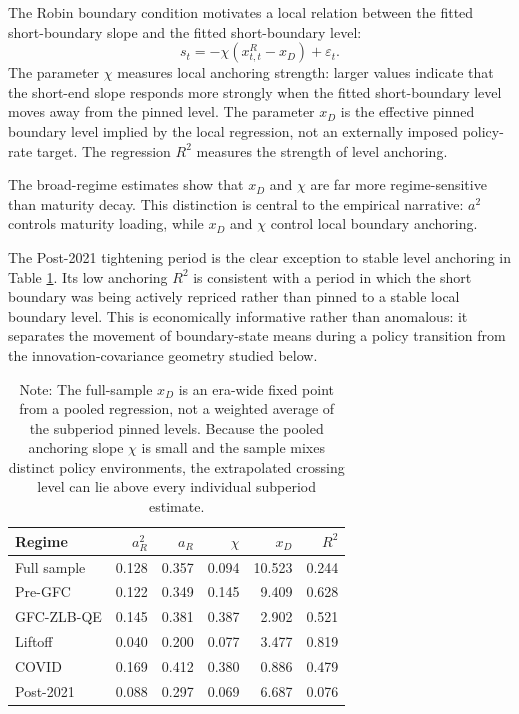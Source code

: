 \documentclass[11pt]{article}
\begin{document}
The Robin boundary condition motivates a local relation between the fitted short-boundary slope and the fitted short-boundary level:
\begin{equation}
 s_t=-\chi(x^R_{t,t}-x_D)+\varepsilon_t.
\label{eq:robin_anchor}
\end{equation}
The parameter $\chi$ measures local anchoring strength: larger values indicate that the short-end slope responds more strongly when the fitted short-boundary level moves away from the pinned level. The parameter $x_D$ is the effective pinned boundary level implied by the local regression, not an externally imposed policy-rate target. The regression $R^2$ measures the strength of level anchoring.

The broad-regime estimates show that $x_D$ and $\chi$ are far more regime-sensitive than maturity decay. This distinction is central to the empirical narrative: $a^2$ controls maturity loading, while $x_D$ and $\chi$ control local boundary anchoring.

The Post-2021 tightening period is the clear exception to stable level anchoring in Table \ref{tab:broad_robin}. Its low anchoring $R^2$ is consistent with a period in which the short boundary was being actively repriced rather than pinned to a stable local boundary level. This is economically informative rather than anomalous: it separates the movement of boundary-state means during a policy transition from the innovation-covariance geometry studied below.

\begin{table}[!htbp]
\centering
\small
\begin{tabular}{lrrrrr}
\toprule
Regime & $a_R^2$ & $a_R$ & $\chi$ & $x_D$ & $R^2$ \\
\midrule
Full sample & 0.128 & 0.357 & 0.094 & 10.523 & 0.244 \\
Pre-GFC & 0.122 & 0.349 & 0.145 & 9.409 & 0.628 \\
GFC-ZLB-QE & 0.145 & 0.381 & 0.387 & 2.902 & 0.521 \\
Liftoff & 0.040 & 0.200 & 0.077 & 3.477 & 0.819 \\
COVID & 0.169 & 0.412 & 0.380 & 0.886 & 0.479 \\
Post-2021 & 0.088 & 0.297 & 0.069 & 6.687 & 0.076 \\
\bottomrule
\end{tabular}
\caption{Broad-regime Robin boundary estimates.}
\label{tab:broad_robin}
\caption*{\footnotesize Note: The full-sample $x_D$ is an era-wide fixed point from a pooled regression, not a weighted average of the subperiod pinned levels. Because the pooled anchoring slope $\chi$ is small and the sample mixes distinct policy environments, the extrapolated crossing level can lie above every individual subperiod estimate.}
\end{table}
\end{document}
